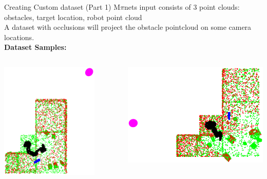 \documentclass{beamer}
\begin{document}
\begin{frame}[t]{Creating Custom dataset (Part 1)}
    M$\pi$nets input consists of 3 point clouds: obstacles, target location, robot point cloud
    \\
    A dataset with occlusions will project the obstacle pointcloud on some camera locations.
    \\
    \textbf{Dataset Samples:}
    \begin{columns}
		\begin{column}{.4\textwidth}
            \begin{center}
                \includegraphics[width=0.8\textwidth]{./img/ds_0.png}
            \end{center}
		\end{column}
		\begin{column}{.4\textwidth}
                \includegraphics[width=1.\textwidth]{./img/ds_1.png}

\end{column}
\end{columns}
\end{frame}
\end{document}

